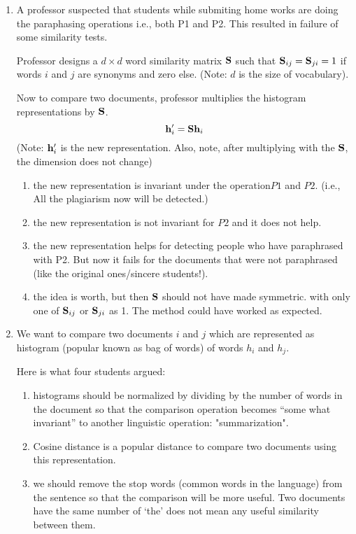 \documentclass{article}
\begin{document}
\begin{enumerate}
    \item A professor suspected that students while submiting home works are doing the paraphasing operations i.e., both P1 and P2. This resulted in failure of  some similarity tests.

    Professor designs a $d\times d$  word similarity matrix ${\bf S}$ such that ${\bf S}_{ij} = {\bf S}_{ji} = 1$ if words $i$ and $j$ are synonyms and zero else. (Note: $d$ is the size of vocabulary).

    Now to compare two documents, professor multiplies the histogram representations by ${\bf S}$.
    \[ {\bf h}_i^\prime = {\bf S}{\bf h}_i  \](Note: ${\bf h}_i^\prime$ is the new representation. Also, note, after multiplying with the ${\bf S}$, the dimension does not change)

    \begin{enumerate}
        \item the new representation is invariant under the operation$P1$ and  $P2$. (i.e.,  All the plagiarism now will be detected.)
        \item the new representation is not invariant for $P2$ and it does not help.
        \item the new representation helps for detecting people who have paraphrased with P2.  But now it
        fails for the documents that were not paraphrased (like the original ones/sincere students!).
        \item the idea is worth, but then ${\bf S}$ should not have made symmetric. with only one of ${\bf S}_{ij}$ or ${\bf S}_{ji}$ as 1. The method could have worked as expected.
    \end{enumerate}

    \item We want to compare two documents $i$ and $j$ which are represented as histogram (popular known as bag of words) of words $h_i$ and $h_j$.

    Here is what four students argued:

    \begin{enumerate}
        \item histograms should be normalized by dividing by the number of words in the document so that the comparison operation becomes ``some what invariant'' to another linguistic operation: "summarization".
        \item Cosine distance is a popular distance to compare two documents using this  representation.
        \item we should remove the stop words (common words in the language) from the sentence so that the comparison will be more useful. Two documents have the same number of `the' does not mean any useful similarity between them.
    \end{enumerate}



\end{enumerate}
\end{document}
